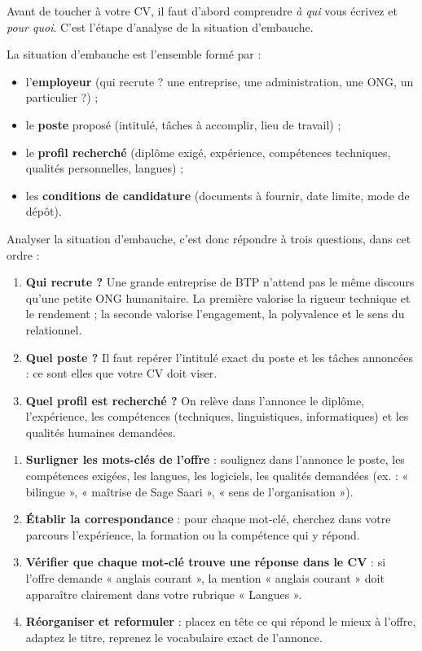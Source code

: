 \documentclass[11pt]{article}
\newcommand{\cle}[1]{{\popxbold\color{popdark}#1}}
\begin{document}
Avant de toucher à votre CV, il faut d'abord comprendre \emph{à qui} vous écrivez et \emph{pour quoi}. C'est l'étape d'\cle{analyse de la situation d'embauche}.

\begin{definition}
La \cle{situation d'embauche} est l'ensemble formé par :
\begin{itemize}
\item l'\textbf{employeur} (qui recrute ? une entreprise, une administration, une ONG, un particulier ?) ;
\item le \textbf{poste} proposé (intitulé, tâches à accomplir, lieu de travail) ;
\item le \textbf{profil recherché} (diplôme exigé, expérience, compétences techniques, qualités personnelles, langues) ;
\item les \textbf{conditions de candidature} (documents à fournir, date limite, mode de dépôt).
\end{itemize}
\end{definition}

Analyser la situation d'embauche, c'est donc répondre à trois questions, dans cet ordre :
\begin{enumerate}
\item \textbf{Qui recrute ?} Une grande entreprise de BTP n'attend pas le même discours qu'une petite ONG humanitaire. La première valorise la rigueur technique et le rendement ; la seconde valorise l'engagement, la polyvalence et le sens du relationnel.
\item \textbf{Quel poste ?} Il faut repérer l'intitulé exact du poste et les tâches annoncées : ce sont elles que votre CV doit viser.
\item \textbf{Quel profil est recherché ?} On relève dans l'annonce le diplôme, l'expérience, les compétences (techniques, linguistiques, informatiques) et les qualités humaines demandées.
\end{enumerate}

\begin{methode}
\begin{enumerate}
\item \textbf{Surligner les mots-clés de l'offre} : soulignez dans l'annonce le poste, les compétences exigées, les langues, les logiciels, les qualités demandées (ex. : « bilingue », « maîtrise de Sage Saari », « sens de l'organisation »).
\item \textbf{Établir la correspondance} : pour chaque mot-clé, cherchez dans votre parcours l'expérience, la formation ou la compétence qui y répond.
\item \textbf{Vérifier que chaque mot-clé trouve une réponse dans le CV} : si l'offre demande « anglais courant », la mention « anglais courant » doit apparaître clairement dans votre rubrique « Langues ».
\item \textbf{Réorganiser et reformuler} : placez en tête ce qui répond le mieux à l'offre, adaptez le titre, reprenez le vocabulaire exact de l'annonce.
\end{enumerate}
\end{methode}
\end{document}

